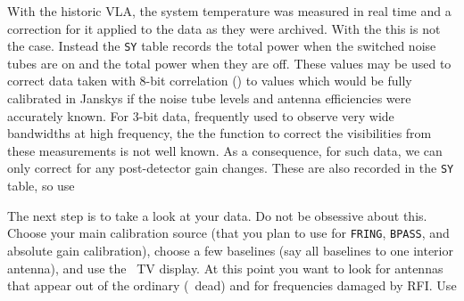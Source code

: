 
With the historic VLA, the system temperature was measured in real
time and a correction for it applied to the data as they were
archived.   With the  this is not the case.  Instead the
{\tt SY} table records the total power when the switched noise tubes
are on and the total power when they are off.  These values may be
used to correct data taken with 8-bit correlation () to
values which would be fully calibrated in Janskys if the noise tube
levels and antenna efficiencies were accurately known.  For 3-bit
data, frequently used to observe very wide bandwidths at high
frequency, the the function to correct the visibilities from these
measurements is not well known.  As a consequence, for such data, we
can only correct for any post-detector gain changes.  These are also
recorded in the {\tt SY} table, so use


The next step is to take a look at your data.  Do not be obsessive
about this.  Choose your main calibration source (that you plan to use
for {\tt FRING}, {\tt BPASS}, and absolute gain calibration), choose
a few baselines (say all baselines to one interior antenna), and use
the \AIPS\ TV display.  At this point you want to look for antennas
that appear out of the ordinary (\ie\ dead) and for frequencies
damaged by RFI\@.  Use

